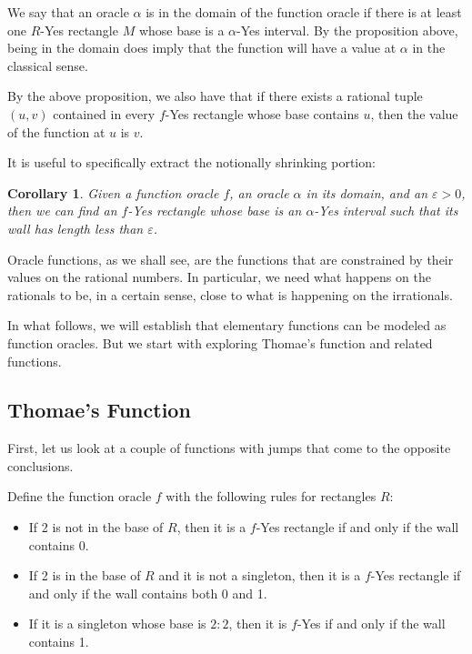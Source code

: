 \documentclass[12pt]{article}
\newtheorem{corollary}{Corollary}[subsection]
\theoremstyle{remark}
\begin{document}
We say that an oracle $\alpha$ is in the domain of the function oracle if there is at least one $R$-Yes rectangle $M$ whose base is a $\alpha$-Yes interval. By the proposition above, being in the domain does imply that the function will have a value at $\alpha$ in the classical sense. 

By the above proposition, we also have that if there exists a rational tuple $(u,v)$ contained in every $f$-Yes rectangle whose base contains $u$, then the value of the function at $u$ is $v$.

It is useful to specifically extract the notionally shrinking portion:

\begin{corollary}\label{cor:fshrink}
Given a function oracle $f$, an oracle $\alpha$ in its domain, and an $\varepsilon > 0$, then we can find an $f$-Yes rectangle whose base is an $\alpha$-Yes interval such that its wall has length less than $\varepsilon$.
\end{corollary}


Oracle functions, as we shall see, are the functions that are constrained by their values on the rational numbers. In particular, we need what happens on the rationals to be, in a certain sense, close to what is happening on the irrationals. 

In what follows, we will establish that elementary functions can be modeled as function oracles. But we start with exploring Thomae's function and related functions.


\subsection{Thomae's Function}

First, let us look at a couple of functions with jumps that come to the opposite conclusions. 

Define the function oracle $f$ with the following rules for rectangles $R$: 

\begin{itemize}
    \item If 2 is not in the base of $R$, then it is a $f$-Yes rectangle if and only if the wall contains 0. 
    \item If 2 is in the base of $R$ and it is not a singleton, then it is a $f$-Yes rectangle if and only if the wall contains both 0 and 1.
    \item If it is a singleton whose base is $2:2$, then it is $f$-Yes if and only if the wall contains 1. 
\end{itemize}
\end{document}
